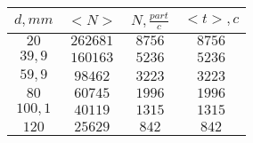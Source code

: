 \begin{tabular}{| c | c | c | c |}
\hline
$d, mm$ & $<N>$ & $N, \frac{part}{c}$ & $<t>, c$\\
\hline
$20$ & $262681$ & $8756$ & $8756$\\
\hline
$39,9$ & $160163$ & $5236$ & $5236$\\
\hline
$59,9$ & $98462$ & $3223$ & $3223$\\
\hline
$80$ & $60745$ & $1996$ & $1996$\\
\hline
$100,1$ & $40119$ & $1315$ & $1315$\\
\hline
$120$ & $25629$ & $842$ & $842$\\
\hline
\end{tabular}
